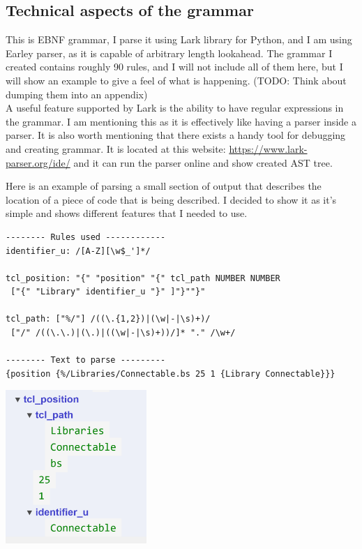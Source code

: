 \documentclass[12pt]{report}
\begin{document}
\subsection{Technical aspects of the grammar}
This is EBNF grammar, I parse it using Lark library for Python, and I am using Earley parser, as it is capable of arbitrary length lookahead. The grammar I created contains roughly 90 rules, and I will not include all of them here, but I will show an example to give a feel of what is happening. (TODO: Think about dumping them into an appendix)   
\\   
A useful feature supported by Lark is the ability to have regular expressions in the grammar. I am mentioning this as it is effectively like having a parser inside a parser. It is also worth mentioning that there exists a handy tool for debugging and creating grammar. It is located at this website: \href{https://www.lark-parser.org/ide/}{https://www.lark-parser.org/ide/} and it can run the parser online and show created AST tree. 
\begin{tcolorbox}[title = Parsing position TODO maybe find a better example with shorter line]
Here is an example of parsing a small section of output that describes the location of a piece of code that is being described. I decided to show it as it's simple and shows different features that I needed to use.
    \begin{verbatim}
-------- Rules used ------------
identifier_u: /[A-Z][\w$_']*/

tcl_position: "{" "position" "{" tcl_path NUMBER NUMBER 
 ["{" "Library" identifier_u "}" ]"}""}"

tcl_path: ["%/"] /((\.{1,2})|(\w|-|\s)+)/ 
 ["/" /((\.\.)|(\.)|((\w|-|\s)+))/]* "." /\w+/

-------- Text to parse ---------
{position {%/Libraries/Connectable.bs 25 1 {Library Connectable}}}
    \end{verbatim}
    \includegraphics[width=0.4\textwidth]{images/TCLPath.png}
\end{tcolorbox}
\end{document}

